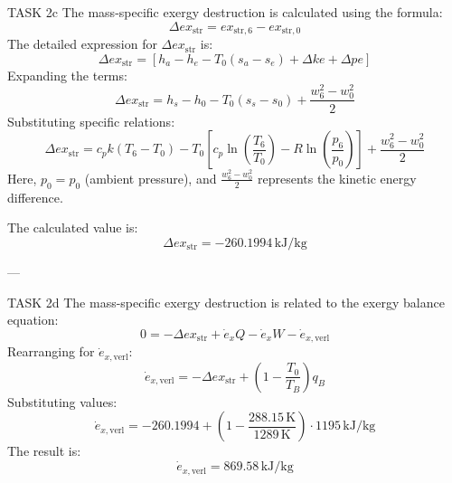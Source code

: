 TASK 2c  
The mass-specific exergy destruction is calculated using the formula:  
\[
\Delta ex_{\text{str}} = ex_{\text{str},6} - ex_{\text{str},0}
\]  
The detailed expression for \(\Delta ex_{\text{str}}\) is:  
\[
\Delta ex_{\text{str}} = [h_a - h_e - T_0(s_a - s_e) + \Delta ke + \Delta pe]
\]  
Expanding the terms:  
\[
\Delta ex_{\text{str}} = h_s - h_0 - T_0(s_s - s_0) + \frac{w_6^2 - w_0^2}{2}
\]  
Substituting specific relations:  
\[
\Delta ex_{\text{str}} = c_p k(T_6 - T_0) - T_0[c_p \ln\left(\frac{T_6}{T_0}\right) - R \ln\left(\frac{p_6}{p_0}\right)] + \frac{w_6^2 - w_0^2}{2}
\]  
Here, \(p_0 = p_0\) (ambient pressure), and \(\frac{w_6^2 - w_0^2}{2}\) represents the kinetic energy difference.  

The calculated value is:  
\[
\Delta ex_{\text{str}} = -260.1994 \, \text{kJ/kg}
\]  

---

TASK 2d  
The mass-specific exergy destruction is related to the exergy balance equation:  
\[
0 = -\Delta ex_{\text{str}} + \dot{e}_x Q - \dot{e}_x W - \dot{e}_{x,\text{verl}}
\]  
Rearranging for \(\dot{e}_{x,\text{verl}}\):  
\[
\dot{e}_{x,\text{verl}} = -\Delta ex_{\text{str}} + \left(1 - \frac{T_0}{T_B}\right) q_B
\]  
Substituting values:  
\[
\dot{e}_{x,\text{verl}} = -260.1994 + \left(1 - \frac{288.15 \, \text{K}}{1289 \, \text{K}}\right) \cdot 1195 \, \text{kJ/kg}
\]  
The result is:  
\[
\dot{e}_{x,\text{verl}} = 869.58 \, \text{kJ/kg}
\]